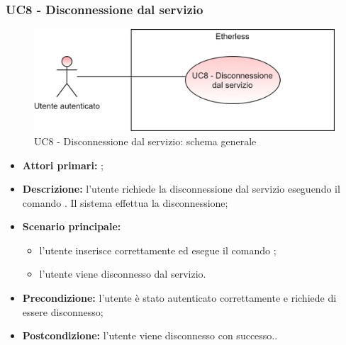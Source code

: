 \subsubsection{UC8 - Disconnessione dal servizio}
\begin{figure}[h]
	\centering
	\includegraphics[scale=\ucs]{./res/img/UC8G.png}
	\caption {UC8 - Disconnessione dal servizio: schema generale}
\end{figure}
\begin{itemize}
	\item \textbf{Attori primari:} \ua{};
	\item \textbf{Descrizione:} l’utente richiede la disconnessione dal servizio eseguendo il comando \logout{}. Il sistema effettua la disconnessione; 
	\item \textbf{Scenario principale:} 
	\begin{itemize}
		\item l'utente inserisce correttamente ed esegue il comando \logout{}; 
		\item l'utente viene disconnesso dal servizio. 
	\end{itemize}
	\item \textbf{Precondizione:} l’utente è stato autenticato correttamente e richiede di essere disconnesso; 
	\item \textbf{Postcondizione:} l’utente viene disconnesso con successo..
\end{itemize}